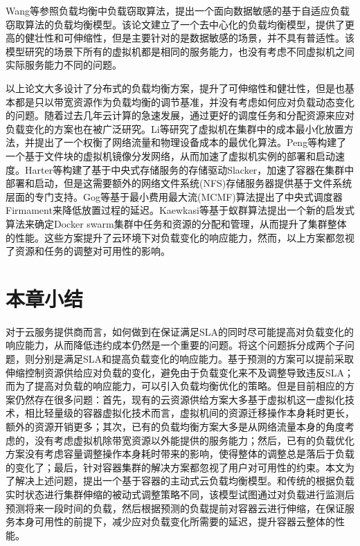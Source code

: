 Wang等参照负载均衡中负载窃取算法，提出一个面向数据敏感的基于自适应负载窃取算法的负载均衡模型\cite{wang2014optimizing}。该论文建立了一个去中心化的负载均衡模型，提供了更高的健壮性和可伸缩性，但是主要针对的是数据敏感的场景，并不具有普适性。该模型研究的场景下所有的虚拟机都是相同的服务能力，也没有考虑不同虚拟机之间实际服务能力不同的问题。

以上论文大多设计了分布式的负载均衡方案，提升了可伸缩性和健壮性，但是也基本都是只以带宽资源作为负载均衡的调节基准，并没有考虑如何应对负载动态变化的问题。随着过去几年云计算的急速发展，通过更好的调度任务和分配资源来应对负载变化的方案也在被广泛研究。Li等研究了虚拟机在集群中的成本最小化放置方法，并提出了一个权衡了网络流量和物理设备成本的最优化算法\cite{li2014let}。Peng等构建了一个基于文件块的虚拟机镜像分发网络，从而加速了虚拟机实例的部署和启动速度\cite{peng2012vdn}。Harter等构建了基于中央式存储服务的存储驱动Slacker，加速了容器在集群中部署和启动，但是这需要额外的网络文件系统(NFS)存储服务器提供基于文件系统层面的专门支持\cite{harter2016slacker}。Gog等基于最小费用最大流(MCMF)算法提出了中央式调度器Firmament来降低放置过程的延迟\cite{gog2016firmament}。Kaewkasi等基于蚁群算法提出一个新的启发式算法来确定Docker swarm集群中任务和资源的分配和管理，从而提升了集群整体的性能\cite{kaewkasi2017improvement}。这些方案提升了云环境下对负载变化的响应能力，然而，以上方案都忽视了资源和任务的调整对可用性的影响。

\section{本章小结}
对于云服务提供商而言，如何做到在保证满足SLA的同时尽可能提高对负载变化的响应能力，从而降低违约成本仍然是一个重要的问题。将这个问题拆分成两个子问题，则分别是满足SLA和提高负载变化的响应能力。基于预测的方案可以提前采取伸缩控制资源供给应对负载的变化，避免由于负载变化来不及调整导致违反SLA；而为了提高对负载的响应能力，可以引入负载均衡优化的策略。但是目前相应的方案仍然存在很多问题：首先，现有的云资源供给方案大多基于虚拟机这一虚拟化技术，相比轻量级的容器虚拟化技术而言，虚拟机间的资源迁移操作本身耗时更长，额外的资源开销更多；其次，已有的负载均衡方案大多是从网络流量本身的角度考虑的，没有考虑虚拟机除带宽资源以外能提供的服务能力；然后，已有的负载优化方案没有考虑容量调整操作本身耗时带来的影响，使得整体的调整总是落后于负载的变化了；最后，针对容器集群的解决方案都忽视了用户对可用性的约束。本文为了解决上述问题，提出一个基于容器的主动式云负载均衡模型。和传统的根据负载实时状态进行集群伸缩的被动式调整策略不同，该模型试图通过对负载进行监测后预测将来一段时间的负载，然后根据预测的负载提前对容器云进行伸缩，在保证服务本身可用性的前提下，减少应对负载变化所需要的延迟，提升容器云整体的性能。